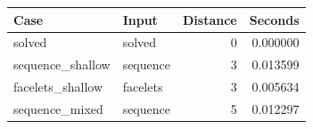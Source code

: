 {\small
\begin{tabular}{llrr}
\hline
Case & Input & Distance & Seconds \\
\hline
solved & solved & 0 & 0.000000 \\
sequence\_shallow & sequence & 3 & 0.013599 \\
facelets\_shallow & facelets & 3 & 0.005634 \\
sequence\_mixed & sequence & 5 & 0.012297 \\
\hline
\end{tabular}
}

